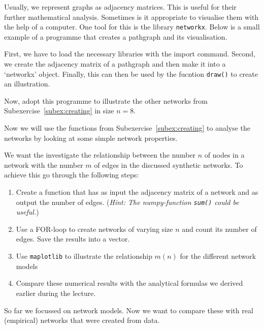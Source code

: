 \exercise[%
  topic=Illustrate Graphs with Python
    ]


Usually, we represent graphs as adjacency matrices. This is useful for their further mathematical analysis. Sometimes is it appropriate to visualise them with the help of a computer. One tool for this is the library {\tt networkx}. Below is a small example of a programme that creates a pathgraph and its visualisation.



First, we have to load the necessary libraries with the {\sc import} command. Second, we create the adjacency matrix of a pathgraph and then make it into a `networkx' object. Finally, this can then be used by the fucntion {\tt draw()}  to create an illustration.

Now, adopt this programme to illustrate the other networks from Subexercise~\ref{subex:creating} in size $n=8$.

  \exercise[%
  topic=Investigating Graphs with Python
    ]
Now we will use the functions from Subexercise~\ref{subex:creating} to analyse the networks by looking at some simple network properties.

 \subexercise[%
  topic=Counting Edges,
    ]

We want the investigate the relationship between the number $n$ of nodes in a network with the number $m$ of edges in the discussed synthetic networks. To achieve this go through the following steps:


\begin{enumerate}
\item Create a function that has as input the adjacency matrix of a network and as output the number of edges. (\emph{Hint: The numpy-function {\tt sum()} could be useful.})
\item Use a FOR-loop to create networks of varying size $n$ and count its number of edges. Save the results into a vector.
\item  Use {\tt maplotlib} to illustrate the relationship $m(n)$ for the different network models
\item Compare these numerical results with the analytical formulas we derived earlier during the lecture.
\end{enumerate}




 \subexercise[%
  topic=Comparing Synthetic with Empiric Networks,
    ]


So far we focussed on network models. Now we want to compare these with real (empirical) networks that were created from data.

